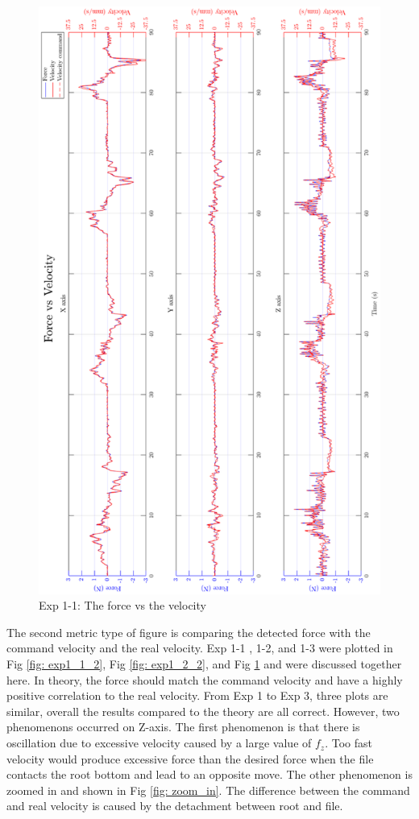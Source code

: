 \begin{figure}[htbp]
\begin{center}
\includegraphics[width=0.9\linewidth]{Images/exp/exp1_3_2.png}
\caption{Exp 1-1: The force vs the velocity}
\label{fig: exp1_3_2}
\end{center}
\end{figure}

\par 
The second metric type of figure is comparing the detected force with the command velocity and the real velocity. Exp 1-1 , 1-2, and 1-3 were plotted in Fig \ref{fig: exp1_1_2}, Fig \ref{fig: exp1_2_2}, and Fig \ref{fig: exp1_3_2} and were discussed together here. In theory, the force should match the command velocity and have a highly positive correlation to the real velocity. From Exp 1 to Exp 3, three plots are similar, overall the results compared to the theory are all correct. However, two phenomenons occurred on Z-axis. The first phenomenon is that there is oscillation due to excessive velocity caused by a large value of $f_z$. Too fast velocity would produce excessive force than the desired force when the file contacts the root bottom and lead to an opposite move. The other phenomenon is zoomed in and shown in Fig \ref{fig: zoom_in}. The difference between the command and real velocity is caused by the detachment between root and file.

